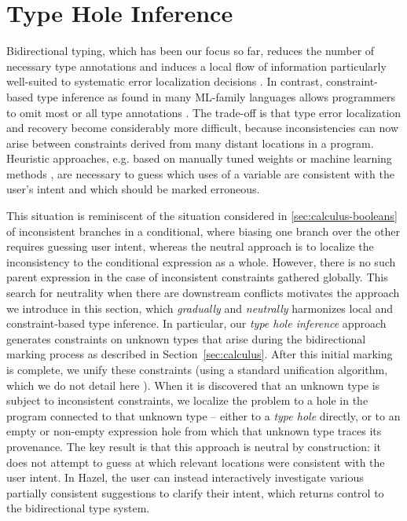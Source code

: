 \section{Type Hole Inference}
\label{sec:thi}

Bidirectional typing, which has been our focus so far, reduces the number of necessary type annotations and induces a local flow of information particularly well-suited to systematic error localization decisions \cite{BidirTyping,Pierce:2000:LTI:345099.345100}. In contrast, 
constraint-based type inference as found in many ML-family languages allows programmers to omit most or all type annotations \cite{Pierce:2000:LTI:345099.345100}. The trade-off is that type error localization and recovery 
become considerably more difficult, because inconsistencies can now arise between 
constraints derived from many distant locations in a program. 
Heuristic approaches, e.g. based on manually tuned weights \cite{DBLP:conf/popl/ZhangM14,DBLP:conf/oopsla/PavlinovicKW14} or machine learning methods \cite{SeidelBlame}, are necessary to guess which uses of a variable are consistent with the user's intent and which should be marked erroneous.

This situation is reminiscent of the situation considered in \cref{sec:calculus-booleans} of inconsistent branches in a conditional, where biasing one branch over the other requires guessing user intent, whereas the neutral approach is to localize the inconsistency to the conditional expression as a whole. However, there is no such parent expression in the case of inconsistent constraints gathered globally.
This search for neutrality when there are downstream conflicts motivates the approach we introduce in this section, which \emph{gradually} and \emph{neutrally} harmonizes local and constraint-based type inference. In particular, our \emph{type hole inference} approach generates constraints on unknown types that arise during the bidirectional marking process as described in Section~\ref{sec:calculus}. After this initial marking is complete, we unify these constraints (using a standard unification algorithm, which we do not detail here \cite{Huet}). When it is discovered that an unknown type is subject to inconsistent constraints, we localize the problem 
to a hole in the program connected to that unknown type -- either to a \emph{type hole} directly, or to an empty or non-empty expression hole from which that unknown type traces its provenance. The key result is that this approach is neutral by construction: it does not attempt to guess at which relevant locations were consistent with the user intent. In Hazel, the user can instead interactively investigate various partially consistent suggestions to clarify their intent, which returns control to the bidirectional type system. 

